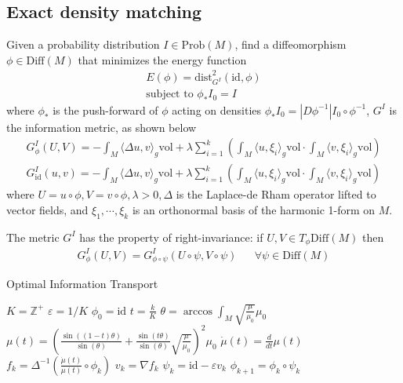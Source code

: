 \documentclass{article}
\theoremstyle{definition}
\theoremstyle{plain}
\begin{document}
\subsection{Exact density matching}
Given a probability distribution $I\in\mathrm{Prob}(M)$, find a diffeomorphism $\phi\in\mathrm{Diff}(M)$ that minimizes the energy function
\begin{align*}
    E(\phi)=\mathrm{dist}^2_{G^I}(\mathrm{id},\phi)\\
    \text{subject to }\phi_*I_0=I
\end{align*}
where $\phi_*$ is the push-forward of $\phi$ acting on densities $\phi_*I_0=|D\phi^{-1}|I_0\circ\phi^{-1}$, $G^I$ is the information metric, as shown below
\begin{align*}
    G^I_\phi(U,V)=-\int_M\langle\Delta u,v\rangle_g \mathrm{vol}+\lambda\sum^k_{i=1}\left(\int_M\langle u,\xi_i\rangle_g \mathrm{vol}\cdot\int_M\langle v,\xi_i\rangle_g \mathrm{vol}\right)\\
    G^I_\mathrm{id}(u,v)=-\int_M\langle\Delta u,v\rangle_g \mathrm{vol}+\lambda\sum^k_{i=1}\left(\int_M\langle u,\xi_i\rangle_g \mathrm{vol}\cdot\int_M\langle v,\xi_i\rangle_g \mathrm{vol}\right)
\end{align*}
where $U=u\circ\phi, V=v\circ\phi, \lambda>0, \Delta$ is the Laplace-de Rham operator lifted to vector fields, and $\xi_1,\cdots,\xi_k$ is an orthonormal basis of the harmonic 1-form on $M$.

The metric $G^I$ has the property of right-invariance: if $U,V\in T_\phi\mathrm{Diff}(M)$ then
\begin{align*}
    G^I_\phi(U,V)=G^I_{\phi\circ\psi}(U\circ\psi,V\circ\psi) && \forall\psi\in\mathrm{Diff}(M)
\end{align*}



\begin{algorithm}  
\caption{Optimal Information Transport}\label{algo1}
    \begin{algorithmic}
        \State $K=\mathbb{Z}^+$
        \State $\varepsilon=1/K$
        \State $\phi_0=\mathrm{id}$
            \State $t=\frac{k}{K}$
            \State $\theta=\arccos\int_M\sqrt{\frac{\mu}{\mu_0}}\mu_0$ 
            \State $\mu(t)=\left(\frac{\sin((1-t)\theta)}{\sin(\theta)}+\frac{\sin(t\theta)}{\sin(\theta)}\sqrt{\frac{\mu}{\mu_0}}\right)^2\mu_0$ 
            \State $\Dot{\mu}(t)=\frac{d}{dt}\mu(t)$ 
            \State $f_k=\Delta^{-1}(\frac{\Dot{\mu}(t)}{\mu(t)}\circ\phi_k)$ 
            \State $v_k=\nabla f_k$ 
            \State $\psi_k=\mathrm{id}-\varepsilon v_k$ 
            \State $\phi_{k+1}=\phi_k\circ\psi_k$ 
        \EndFor
        \State \Return{$\phi$}
    \end{algorithmic}  
\end{algorithm}  
\end{document}
